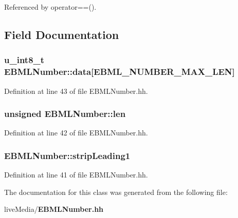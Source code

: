 Referenced by operator==().



\subsection{Field Documentation}
\subsubsection[{data}]{\setlength{\rightskip}{0pt plus 5cm}u\+\_\+int8\+\_\+t E\+B\+M\+L\+Number\+::data[{\bf E\+B\+M\+L\+\_\+\+N\+U\+M\+B\+E\+R\+\_\+\+M\+A\+X\+\_\+\+L\+E\+N}]}\label{classEBMLNumber_acbc391622758f4f0aee034009df36c26}


Definition at line 43 of file E\+B\+M\+L\+Number.\+hh.

\subsubsection[{len}]{\setlength{\rightskip}{0pt plus 5cm}unsigned E\+B\+M\+L\+Number\+::len}\label{classEBMLNumber_a6b5f1ad3ad90d142dedbde1d15300e11}


Definition at line 42 of file E\+B\+M\+L\+Number.\+hh.

\subsubsection[{strip\+Leading1}]{ E\+B\+M\+L\+Number\+::strip\+Leading1}\label{classEBMLNumber_a6a5eeb12e3e64758586ce890b4beafca}


Definition at line 41 of file E\+B\+M\+L\+Number.\+hh.



The documentation for this class was generated from the following file\+:\begin{DoxyCompactItemize}
\item 
live\+Media/{\bf E\+B\+M\+L\+Number.\+hh}\end{DoxyCompactItemize}
